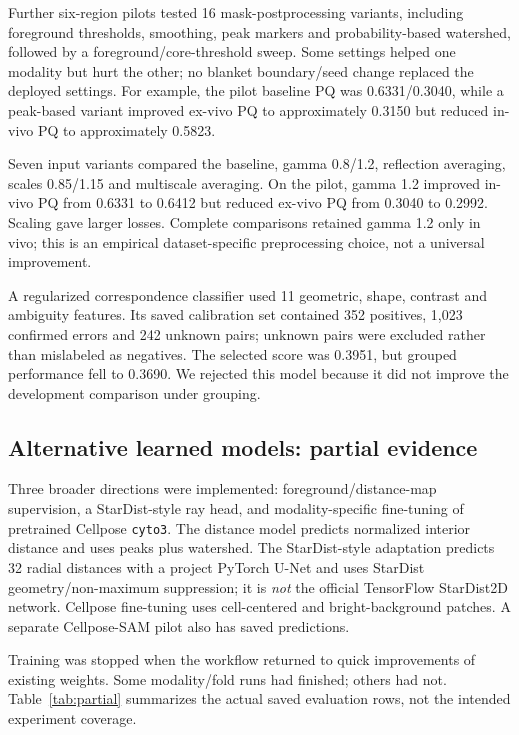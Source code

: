 \documentclass[11pt]{article}
\begin{document}
Further six-region pilots tested 16 mask-postprocessing variants, including foreground thresholds, smoothing, peak markers and probability-based watershed, followed by a foreground/core-threshold sweep. Some settings helped one modality but hurt the other; no blanket boundary/seed change replaced the deployed settings. For example, the pilot baseline PQ was 0.6331/0.3040, while a peak-based variant improved ex-vivo PQ to approximately 0.3150 but reduced in-vivo PQ to approximately 0.5823.

Seven input variants compared the baseline, gamma 0.8/1.2, reflection averaging, scales 0.85/1.15 and multiscale averaging. On the pilot, gamma 1.2 improved in-vivo PQ from 0.6331 to 0.6412 but reduced ex-vivo PQ from 0.3040 to 0.2992. Scaling gave larger losses. Complete comparisons retained gamma 1.2 only in vivo; this is an empirical dataset-specific preprocessing choice, not a universal improvement.

A regularized correspondence classifier used 11 geometric, shape, contrast and ambiguity features. Its saved calibration set contained 352 positives, 1,023 confirmed errors and 242 unknown pairs; unknown pairs were excluded rather than mislabeled as negatives. The selected score was 0.3951, but grouped performance fell to 0.3690. We rejected this model because it did not improve the development comparison under grouping.

\subsection{Alternative learned models: partial evidence}
Three broader directions were implemented: foreground/distance-map supervision, a StarDist-style ray head, and modality-specific fine-tuning of pretrained Cellpose \texttt{cyto3}. The distance model predicts normalized interior distance and uses peaks plus watershed. The StarDist-style adaptation predicts 32 radial distances with a project PyTorch U-Net and uses StarDist geometry/non-maximum suppression; it is \emph{not} the official TensorFlow StarDist2D network. Cellpose fine-tuning uses cell-centered and bright-background patches. A separate Cellpose-SAM pilot also has saved predictions.

Training was stopped when the workflow returned to quick improvements of existing weights. Some modality/fold runs had finished; others had not. Table~\ref{tab:partial} summarizes the actual saved evaluation rows, not the intended experiment coverage.
\end{document}
